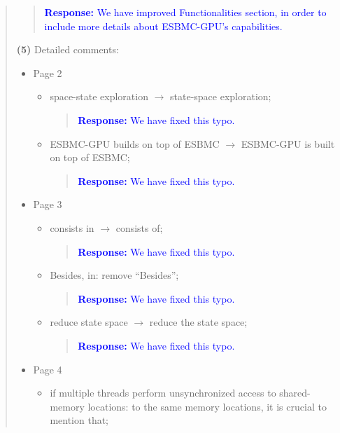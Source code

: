 \documentclass[11pt]{article}
\begin{document}
\begin{quote}
\begin{quote}
\textcolor{blue}{\textbf{Response:} We have improved Functionalities section, in order to include more details about ESBMC-GPU's capabilities.}
\end{quote}

{\bf (5)} Detailed comments:
\begin{itemize}
\item Page 2
  \begin{itemize}
  \item space-state exploration $\rightarrow$ state-space exploration;
  
    \begin{quote}
    \textcolor{blue}{\textbf{Response:} We have fixed this typo.}
    \end{quote}

  \item ESBMC-GPU builds on top of ESBMC $\rightarrow$ ESBMC-GPU is built on top of ESBMC;
  
    \begin{quote}
    \textcolor{blue}{\textbf{Response:} We have fixed this typo.}
    \end{quote}

  \end{itemize}
\item Page 3
  \begin{itemize}
  \item consists in $\rightarrow$ consists of;
  
    \begin{quote}
    \textcolor{blue}{\textbf{Response:} We have fixed this typo.}
    \end{quote}

  \item Besides, in: remove ``Besides'';
  
    \begin{quote}
    \textcolor{blue}{\textbf{Response:} We have fixed this typo.}
    \end{quote}

  \item reduce state space $\rightarrow$ reduce the state space;
  
    \begin{quote}
    \textcolor{blue}{\textbf{Response:} We have fixed this typo.}
    \end{quote}

  \end{itemize}
\item Page 4
  \begin{itemize}
  \item if multiple threads perform unsynchronized access to shared-memory locations: to the same memory locations, it is crucial to mention that;
  

\end{itemize}
\end{itemize}
\end{quote}
\end{document}
